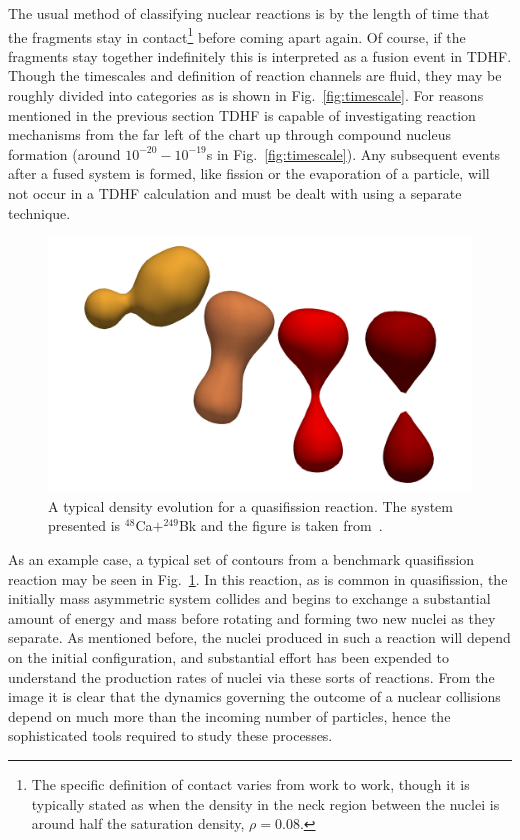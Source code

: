 The usual method of classifying nuclear reactions is by the length of time that the fragments stay in contact\footnote{The specific definition of contact varies from work to work, though it is typically stated as when the density in the neck region between the nuclei is around half the saturation density, $\rho=0.08$.} before coming apart again.
Of course, if the fragments stay together indefinitely this is interpreted as a fusion event in TDHF.
Though the timescales and definition of reaction channels are fluid, they may be roughly divided into categories as is shown in Fig.~\ref{fig:timescale}.
For reasons mentioned in the previous section TDHF is capable of investigating reaction mechanisms from the far left of the chart up through compound nucleus formation (around $10^{-20}-10^{-19}$s in Fig.~\ref{fig:timescale}).
Any subsequent events after a fused system is formed, like fission or the evaporation of a particle, will not occur in a TDHF calculation and must be dealt with using a separate technique.

\begin{figure}[t]
	\includegraphics[width=\textwidth]{../Figures/intro_figs/48Ca249BkEvolution_tr.png}
	\caption{A typical density evolution for a quasifission reaction. The system presented is $^{48}$Ca$+^{249}$Bk and the figure is taken from~\citep{godbey2020}.}
	\label{fig:qf}
\end{figure}

As an example case, a typical set of contours from a benchmark quasifission reaction may be seen in Fig.~\ref{fig:qf}.
In this reaction, as is common in quasifission, the initially mass asymmetric system collides and begins to exchange a substantial amount of energy and mass before rotating and forming two new nuclei as they separate.
As mentioned before, the nuclei produced in such a reaction will depend on the initial configuration, and substantial effort has been expended to understand the production rates of nuclei via these sorts of reactions.
From the image it is clear that the dynamics governing the outcome of a nuclear collisions depend on much more than the incoming number of particles, hence the sophisticated tools required to study these processes.


